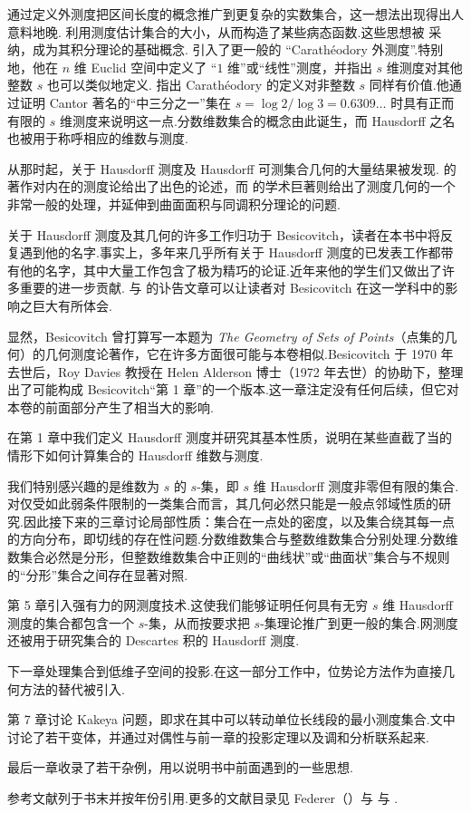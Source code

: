 通过定义外测度把区间长度的概念推广到更复杂的实数集合，这一想法出现得出人意料地晚.\textcite{borel1895} 利用测度估计集合的大小，从而构造了某些病态函数.这些思想被 \textcite{lebesgue1904} 采纳，成为其积分理论的基础概念.\textcite{caratheodory1914} 引入了更一般的 ``Carathéodory 外测度''.特别地，他在 $n$ 维 Euclid 空间中定义了 ``$1$ 维''或``线性''测度，并指出 $s$ 维测度对其他整数 $s$ 也可以类似地定义.\textcite{hausdorff1919} 指出 Carathéodory 的定义对非整数 $s$ 同样有价值.他通过证明 Cantor 著名的``中三分之一''集在 $s=\log 2/\log 3=0.6309\ldots$ 时具有正而有限的 $s$ 维测度来说明这一点.分数维数集合的概念由此诞生，而 Hausdorff 之名也被用于称呼相应的维数与测度.

从那时起，关于 Hausdorff 测度及 Hausdorff 可测集合几何的大量结果被发现.\textcite{rogers1970} 的著作对内在的测度论给出了出色的论述，而 \textcite{federer1969} 的学术巨著则给出了测度几何的一个非常一般的处理，并延伸到曲面面积与同调积分理论的问题.

关于 Hausdorff 测度及其几何的许多工作归功于 Besicovitch，读者在本书中将反复遇到他的名字.事实上，多年来几乎所有关于 Hausdorff 测度的已发表工作都带有他的名字，其中大量工作包含了极为精巧的论证.近年来他的学生们又做出了许多重要的进一步贡献.\textcite{burkill1971} 与 \textcite{taylor1975} 的讣告文章可以让读者对 Besicovitch 在这一学科中的影响之巨大有所体会.

显然，Besicovitch 曾打算写一本题为 \emph{The Geometry of Sets of Points}（点集的几何）的几何测度论著作，它在许多方面很可能与本卷相似.Besicovitch 于 1970 年去世后，Roy Davies 教授在 Helen Alderson 博士（1972 年去世）的协助下，整理出了可能构成 Besicovitch``第 1 章''的一个版本.这一章注定没有任何后续，但它对本卷的前面部分产生了相当大的影响.

在第 1 章中我们定义 Hausdorff 测度并研究其基本性质，说明在某些直截了当的情形下如何计算集合的 Hausdorff 维数与测度.

我们特别感兴趣的是维数为 $s$ 的 $s$-集，即 $s$ 维 Hausdorff 测度非零但有限的集合.对仅受如此弱条件限制的一类集合而言，其几何必然只能是一般点邻域性质的研究.因此接下来的三章讨论局部性质：集合在一点处的密度，以及集合绕其每一点的方向分布，即切线的存在性问题.分数维数集合与整数维数集合分别处理.分数维数集合必然是分形，但整数维数集合中正则的``曲线状''或``曲面状''集合与不规则的``分形''集合之间存在显著对照.

第 5 章引入强有力的网测度技术.这使我们能够证明任何具有无穷 $s$ 维 Hausdorff 测度的集合都包含一个 $s$-集，从而按要求把 $s$-集理论推广到更一般的集合.网测度还被用于研究集合的 Descartes 积的 Hausdorff 测度.

下一章处理集合到低维子空间的投影.在这一部分工作中，位势论方法作为直接几何方法的替代被引入.

第 7 章讨论 Kakeya 问题，即求在其中可以转动单位长线段的最小测度集合.文中讨论了若干变体，并通过对偶性与前一章的投影定理以及调和分析联系起来.

最后一章收录了若干杂例，用以说明书中前面遇到的一些思想.

参考文献列于书末并按年份引用.更多的文献目录见 Federer（\citeyear{federer1947,federer1969}）与 \textcite{rogers1970} 与 \textcite{mandelbrot1982}.
